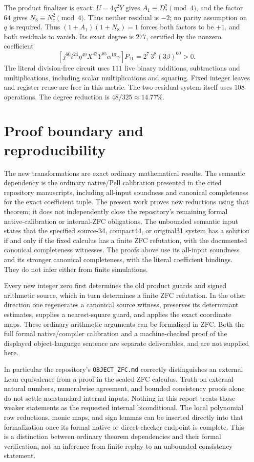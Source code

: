 \documentclass[11pt]{article}
\begin{document}
The product finalizer is exact: $U=4q^2Y$ gives
$A_1\equiv D_*^2\pmod4$, and the factor $64$ gives
$N_8\equiv N_c^2\pmod4$. Thus neither residual is $-2$; no parity
assumption on $q$ is required. Thus
$(1+A_1)(1+N_8)=1$ forces both factors to be $+1$, and both residuals to
vanish. Its exact degree is $277$, certified by the nonzero coefficient
\[
 [j^{60}i^{24}\eta^{49}X^{42}Y^{85}\alpha^{16}\gamma]P_{11}
 =2^7\,3^8(3\beta)^{60}>0.
\]
The literal division-free circuit uses $111$ live binary additions,
subtractions and multiplications, including scalar multiplications and
squaring. Fixed integer leaves and register reuse are free in this metric.
The two-residual system itself uses $108$ operations. The degree reduction
is $48/325\approx14.77\%$.



\section{Proof boundary and reproducibility}
\label{sec:boundary}
The new transformations are exact ordinary mathematical results. The
semantic dependency is the ordinary native/Pell calibration presented in
the cited repository manuscripts, including all-input soundness and
canonical completeness for the exact coefficient tuple. The present work
proves new reductions using that theorem; it does not independently close
the repository's remaining formal native-calibration or internal-ZFC
obligations. The unbounded semantic input states that
the specified source-34, compact44, or original31 system has a solution if and only
if the fixed calculus has a finite ZFC refutation, with the documented
canonical completeness witnesses. The proofs above use its all-input
soundness and its stronger canonical completeness, with the literal
coefficient bindings. They do not infer either from finite simulations.

Every new integer zero first determines the old product guards and signed
arithmetic source, which in turn determines a finite ZFC refutation.
In the other direction one regenerates a canonical source witness,
preserves its determinant estimates, supplies a nearest-square guard, and
applies the exact coordinate maps. These ordinary arithmetic arguments
can be formalized in ZFC. Both the full formal native/compiler calibration
and a machine-checked proof of the displayed object-language sentence are
separate deliverables, and are not supplied here.

In particular the repository's \texttt{OBJECT\_ZFC.md} correctly distinguishes
an external Lean equivalence from a proof in the sealed ZFC calculus.
Truth on external natural numbers, numeralwise agreement, and bounded
consistency proofs alone do not settle nonstandard internal inputs.
Nothing in this report treats those weaker statements as the requested
internal biconditional. The local polynomial row reductions, monic maps,
and sign lemmas can be inserted directly into that formalization once its
formal native or direct-checker endpoint is complete. This is a distinction
between ordinary theorem dependencies and their formal verification, not an
inference from finite replay to an unbounded consistency statement.
\end{document}
